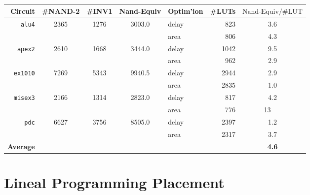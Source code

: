 \documentclass[12pt]{article}
\begin{document}
\section{}
\begin{table}[H]\centering\begin{tabular}{ r *3c || l  r | c }
\hline\hline
Circuit & \#NAND-2 & \#INV1 & Nand-Equiv & Optim'ion & \#LUTs & \({\text{Nand-Equiv}}/{\text{\#LUT}}\) \\
\hline
\texttt{alu4}   & 2365 & 1276 & 3003.0 & delay &  823 &  3.6 \\
                &      &      &        & area  &  806 &  4.3 \\
\texttt{apex2}  & 2610 & 1668 & 3444.0 & delay & 1042 &  9.5 \\
                &      &      &        & area  &  962 &  2.9 \\
\texttt{ex1010} & 7269 & 5343 & 9940.5 & delay & 2944 &  2.9 \\
                &      &      &        & area  & 2835 &  1.0 \\
\texttt{misex3} & 2166 & 1314 & 2823.0 & delay &  817 &  4.2 \\
                &      &      &        & area  &  776 &  13{\ \ \ } \\
\texttt{pdc}    & 6627 & 3756 & 8505.0 & delay & 2397 &  1.2 \\
                &      &      &        & area  & 2317 &  3.7 \\
\hline
\textbf{Average}&      &      &        &       &      & \textbf{4.6} \\
\hline\hline
\end{tabular}\caption{}\label{tab:nand-equiv}\end{table}

\part{Lineal Programming Placement}
\section{}
\end{document}

